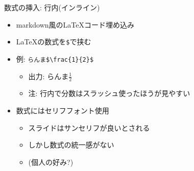 \documentclass[
  12pt,
  ignorenonframetext,
]{beamer}
\providecommand{\tightlist}{%
  \setlength{\itemsep}{0pt}\setlength{\parskip}{0pt}}
\begin{document}
\begin{frame}[fragile]{数式の挿入: 行内(インライン)}
\protect\hypertarget{ux6570ux5f0fux306eux633fux5165-ux884cux5185ux30a4ux30f3ux30e9ux30a4ux30f3}{}

\begin{itemize}
\tightlist
\item
  markdown風のLaTeXコード埋め込み
\item
  \LaTeX の数式を\texttt{\$}で挟む
\item
  例: \texttt{らんま\$\textbackslash{}frac\{1\}\{2\}\$}

  \begin{itemize}
  \tightlist
  \item
    出力: らんま\(\frac{1}{2}\)
  \item
    注: 行内で分数はスラッシュ使ったほうが見やすい
  \end{itemize}
\item
  数式にはセリフフォント使用

  \begin{itemize}
  \tightlist
  \item
    スライドはサンセリフが良いとされる
  \item
    しかし数式の統一感がない
  \item
    (個人の好み?)
  \end{itemize}
\end{itemize}

\end{frame}
\end{document}
